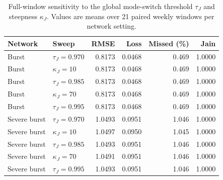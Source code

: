 \begin{table}[t]
\centering
\caption{Full-window sensitivity to the global mode-switch threshold $\tau_J$ and steepness $\kappa_J$. Values are means over 21 paired weekly windows per network setting.}
\label{tab:sensitivity_mode_switch}
\begin{tabular}{llrrrr}
\hline
Network & Sweep & RMSE & Loss & Missed (\%) & Jain \\
\hline
Burst & $\tau_J=0.970$ & 0.8173 & 0.0468 & 0.469 & 1.0000 \\
Burst & $\kappa_J=10$ & 0.8173 & 0.0468 & 0.469 & 1.0000 \\
Burst & $\tau_J=0.985$ & 0.8173 & 0.0468 & 0.469 & 1.0000 \\
Burst & $\kappa_J=70$ & 0.8173 & 0.0468 & 0.469 & 1.0000 \\
Burst & $\tau_J=0.995$ & 0.8173 & 0.0468 & 0.469 & 1.0000 \\
\hline
Severe burst & $\tau_J=0.970$ & 1.0493 & 0.0951 & 1.046 & 1.0000 \\
Severe burst & $\kappa_J=10$ & 1.0497 & 0.0950 & 1.045 & 1.0000 \\
Severe burst & $\tau_J=0.985$ & 1.0493 & 0.0951 & 1.046 & 1.0000 \\
Severe burst & $\kappa_J=70$ & 1.0491 & 0.0951 & 1.046 & 1.0000 \\
Severe burst & $\tau_J=0.995$ & 1.0493 & 0.0951 & 1.046 & 1.0000 \\
\hline
\end{tabular}
\end{table}
